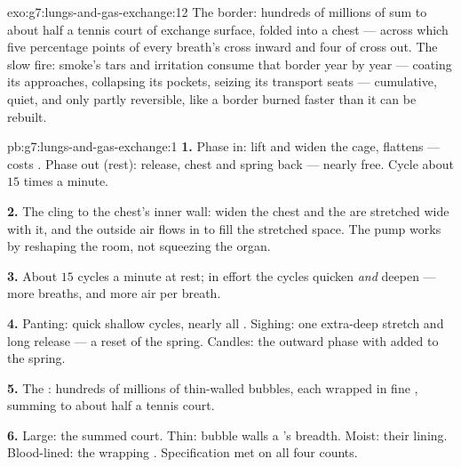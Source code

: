 \begin{solution}{exo:g7:lungs-and-gas-exchange:12}
The border: hundreds of millions of  sum to about
half a tennis court of exchange surface, folded into a
chest --- across which five percentage points of every
breath's  cross inward and four of 
cross out. The slow fire: smoke's tars and irritation
consume that border year by year --- coating its
approaches, collapsing its pockets, seizing its transport
seats --- cumulative, quiet, and only partly reversible,
like a border burned faster than it can be rebuilt.
\end{solution}

\begin{solution}{pb:g7:lungs-and-gas-exchange:1}
\textbf{1.} Phase in:   lift and widen the cage,
 flattens --- costs . Phase out (rest):
 release, chest and  spring back --- nearly
free. Cycle about $15$ times a minute.

\textbf{2.} The  cling to the chest's inner wall:
widen the chest and the  are stretched wide with it,
and the outside air flows in to fill the stretched space.
The pump works by reshaping the room, not squeezing the
organ.

\textbf{3.} About $15$ cycles a minute at rest; in effort
the cycles quicken \emph{and} deepen --- more breaths,
and more air per breath.

\textbf{4.} Panting: quick shallow cycles, nearly all
. Sighing: one extra-deep stretch and long
release --- a reset of the spring. Candles: the outward
phase with  added to the spring.

\textbf{5.} The : hundreds of millions of
thin-walled bubbles, each wrapped in fine ,
summing to about half a tennis court.

\textbf{6.} Large: the summed court. Thin: bubble walls a
's breadth. Moist: their lining. Blood-lined: the
wrapping . Specification met on all four counts.


\end{solution}
